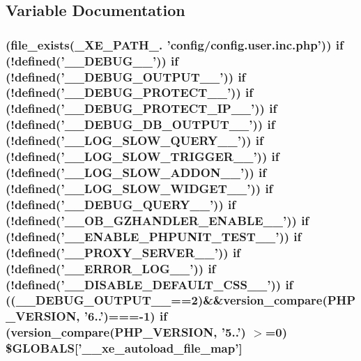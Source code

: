 \subsection{Variable Documentation}
\hypertarget{config_8inc_8php_a38f1c3c542a43174a268208f45dca44e}{
\subsubsection[{\$\-G\-L\-O\-B\-A\-L\-S}]{ (file\-\_\-exists(\-\_\-\-X\-E\-\_\-\-P\-A\-T\-H\-\_\-. 'config/config.\-user.\-inc.\-php')) {\bf if} (!defined('\-\_\-\-\_\-\-D\-E\-B\-U\-G\-\_\-\-\_\-')) {\bf if} (!defined('\-\_\-\-\_\-\-D\-E\-B\-U\-G\-\_\-\-O\-U\-T\-P\-U\-T\-\_\-\-\_\-')) {\bf if} (!defined('\-\_\-\-\_\-\-D\-E\-B\-U\-G\-\_\-\-P\-R\-O\-T\-E\-C\-T\-\_\-\-\_\-')) {\bf if} (!defined('\-\_\-\-\_\-\-D\-E\-B\-U\-G\-\_\-\-P\-R\-O\-T\-E\-C\-T\-\_\-\-I\-P\-\_\-\-\_\-')) {\bf if} (!defined('\-\_\-\-\_\-\-D\-E\-B\-U\-G\-\_\-\-D\-B\-\_\-\-O\-U\-T\-P\-U\-T\-\_\-\-\_\-')) {\bf if} (!defined('\-\_\-\-\_\-\-L\-O\-G\-\_\-\-S\-L\-O\-W\-\_\-\-Q\-U\-E\-R\-Y\-\_\-\-\_\-')) {\bf if} (!defined('\-\_\-\-\_\-\-L\-O\-G\-\_\-\-S\-L\-O\-W\-\_\-\-T\-R\-I\-G\-G\-E\-R\-\_\-\-\_\-')) {\bf if} (!defined('\-\_\-\-\_\-\-L\-O\-G\-\_\-\-S\-L\-O\-W\-\_\-\-A\-D\-D\-O\-N\-\_\-\-\_\-')) {\bf if} (!defined('\-\_\-\-\_\-\-L\-O\-G\-\_\-\-S\-L\-O\-W\-\_\-\-W\-I\-D\-G\-E\-T\-\_\-\-\_\-')) {\bf if} (!defined('\-\_\-\-\_\-\-D\-E\-B\-U\-G\-\_\-\-Q\-U\-E\-R\-Y\-\_\-\-\_\-')) {\bf if} (!defined('\-\_\-\-\_\-\-O\-B\-\_\-\-G\-Z\-H\-A\-N\-D\-L\-E\-R\-\_\-\-E\-N\-A\-B\-L\-E\-\_\-\-\_\-')) {\bf if} (!defined('\-\_\-\-\_\-\-E\-N\-A\-B\-L\-E\-\_\-\-P\-H\-P\-U\-N\-I\-T\-\_\-\-T\-E\-S\-T\-\_\-\-\_\-')) {\bf if} (!defined('\-\_\-\-\_\-\-P\-R\-O\-X\-Y\-\_\-\-S\-E\-R\-V\-E\-R\-\_\-\-\_\-')) {\bf if} (!defined('\-\_\-\-\_\-\-E\-R\-R\-O\-R\-\_\-\-L\-O\-G\-\_\-\-\_\-')) {\bf if} (!defined('\-\_\-\-\_\-\-D\-I\-S\-A\-B\-L\-E\-\_\-\-D\-E\-F\-A\-U\-L\-T\-\_\-\-C\-S\-S\-\_\-\-\_\-')) {\bf if} ((\-\_\-\-\_\-\-D\-E\-B\-U\-G\-\_\-\-O\-U\-T\-P\-U\-T\-\_\-\-\_\-==2)\&\&version\-\_\-compare(P\-H\-P\-\_\-\-V\-E\-R\-S\-I\-O\-N, '6..')===-\/1) {\bf if} (version\-\_\-compare(P\-H\-P\-\_\-\-V\-E\-R\-S\-I\-O\-N, '5..') $>$=0) \$G\-L\-O\-B\-A\-L\-S\mbox{[}'\-\_\-\-\_\-xe\-\_\-autoload\-\_\-file\-\_\-map'\mbox{]}}}\label{config_8inc_8php_a38f1c3c542a43174a268208f45dca44e}


